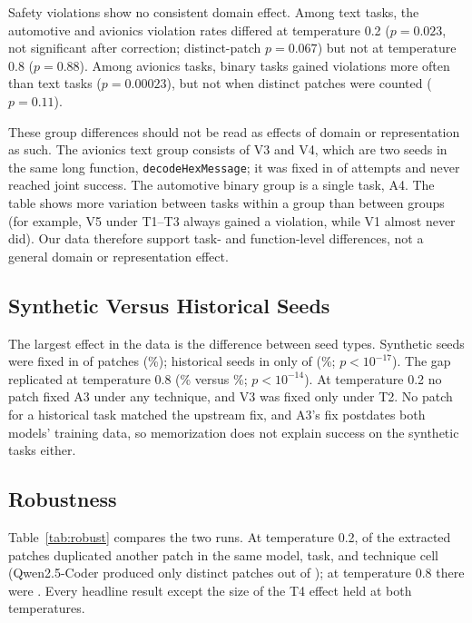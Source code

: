 \documentclass[12pt]{IEEEtran}
\begin{document}
Safety violations show no consistent domain effect. Among text tasks, the automotive and avionics violation rates differed at temperature 0.2 ($p = 0.023$, not significant after correction; distinct-patch $p = 0.067$) but not at temperature 0.8 ($p = 0.88$). Among avionics tasks, binary tasks gained violations more often than text tasks ($p = 0.00023$), but not when distinct patches were counted ($p = 0.11$).



These group differences should not be read as effects of domain or representation as such. The avionics text group consists of V3 and V4, which are two seeds in the same long function, \texttt{decodeHexMessage}; it was fixed in  of  attempts and never reached joint success. The automotive binary group is a single task, A4. The table shows more variation between tasks within a group than between groups (for example, V5 under T1--T3 always gained a violation, while V1 almost never did). Our data therefore support task- and function-level differences, not a general domain or representation effect.

\subsection{Synthetic Versus Historical Seeds}
The largest effect in the data is the difference between seed types. Synthetic seeds were fixed in  of  patches (\%); historical seeds in only  of  (\%; $p < 10^{-17}$). The gap replicated at temperature 0.8 (\% versus \%; $p < 10^{-14}$). At temperature 0.2 no patch fixed A3 under any technique, and V3 was fixed only under T2. No patch for a historical task matched the upstream fix, and A3's fix postdates both models' training data, so memorization does not explain success on the synthetic tasks either.

\subsection{Robustness}

Table~\ref{tab:robust} compares the two runs. At temperature 0.2,  of the  extracted patches duplicated another patch in the same model, task, and technique cell (Qwen2.5-Coder produced only  distinct patches out of ); at temperature 0.8 there were . Every headline result except the size of the T4 effect held at both temperatures.
\end{document}
